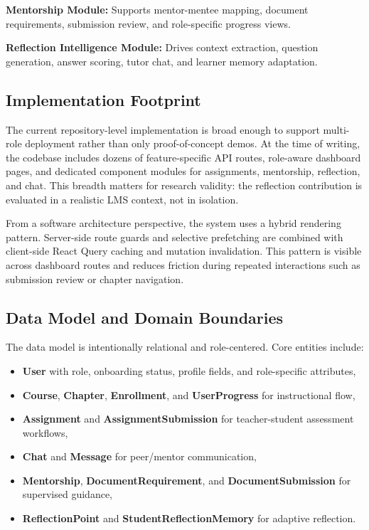 \documentclass[conference]{IEEEtran}
\begin{document}
\textbf{Mentorship Module:} Supports mentor-mentee mapping, document requirements, submission review, and role-specific progress views.

\textbf{Reflection Intelligence Module:} Drives context extraction, question generation, answer scoring, tutor chat, and learner memory adaptation.

\subsection{Implementation Footprint}
The current repository-level implementation is broad enough to support multi-role deployment rather than only proof-of-concept demos. At the time of writing, the codebase includes dozens of feature-specific API routes, role-aware dashboard pages, and dedicated component modules for assignments, mentorship, reflection, and chat. This breadth matters for research validity: the reflection contribution is evaluated in a realistic LMS context, not in isolation.

From a software architecture perspective, the system uses a hybrid rendering pattern. Server-side route guards and selective prefetching are combined with client-side React Query caching and mutation invalidation. This pattern is visible across dashboard routes and reduces friction during repeated interactions such as submission review or chapter navigation.

\subsection{Data Model and Domain Boundaries}
The data model is intentionally relational and role-centered. Core entities include:
\begin{itemize}
\item \textbf{User} with role, onboarding status, profile fields, and role-specific attributes,
\item \textbf{Course}, \textbf{Chapter}, \textbf{Enrollment}, and \textbf{UserProgress} for instructional flow,
\item \textbf{Assignment} and \textbf{AssignmentSubmission} for teacher-student assessment workflows,
\item \textbf{Chat} and \textbf{Message} for peer/mentor communication,
\item \textbf{Mentorship}, \textbf{DocumentRequirement}, and \textbf{DocumentSubmission} for supervised guidance,
\item \textbf{ReflectionPoint} and \textbf{StudentReflectionMemory} for adaptive reflection.
\end{itemize}
\end{document}
